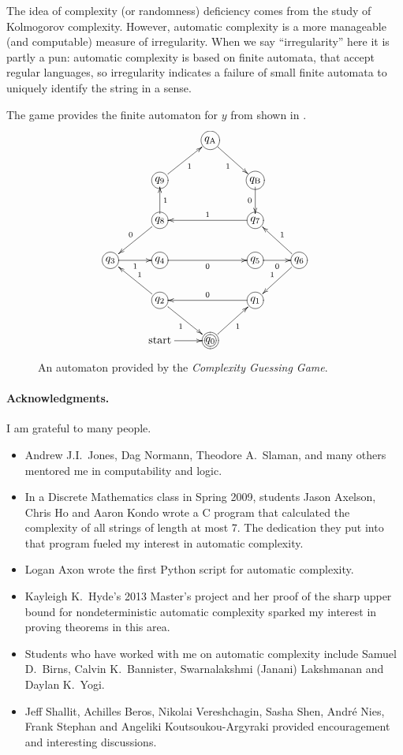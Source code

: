 	The idea of complexity (or randomness) deficiency comes from the study of Kolmogorov complexity.
	However, automatic complexity is a more manageable (and computable) measure of irregularity.
	When we say ``irregularity'' here it is partly a pun:
	automatic complexity is based on finite automata, that accept regular languages,
	so irregularity indicates a failure of small finite automata to uniquely identify the string in a sense.

	The game provides the finite automaton for $y$ from  shown in .
	\begin{figure}
		\centering
		\[
			\xymatrix{
									&								& *+[Fo]{q_{\mathrm A}}\ar[dr]_1   &			   &\\
									& *+[Fo]{q_9}\ar[ur]_1			&				   & *+[Fo]{q_{\mathrm B}}\ar[d]_0  \\
									& *+[Fo]{q_8}\ar[u]_1\ar[dl]_0	&				   & *+[Fo]{q_7}\ar[ll]_1			\\
				*+[Fo]{q_3}\ar[r]_1 & *+[Fo]{q_4}\ar[rr]_0			&				   & *+[Fo]{q_5}\ar[r]_0		   & *+[Fo]{q_6}\ar[ul]_1\ar[dl]_1\\
									& *+[Fo]{q_2}\ar[ul]_1\ar[dr]_1	&				   & *+[Fo]{q_1}\ar[ll]_0		   & \\
									&\text{start}\ar[r]				& *+[Foo]{q_0}\ar[ur]_1
			}
		\]
		\caption{An automaton provided by the \emph{Complexity Guessing Game}.}\label{y-automaton}
	\end{figure}
	\paragraph*{Acknowledgments.}
	I am grateful to many people.
	\begin{itemize}
		\item Andrew J.I.~Jones, Dag Normann, Theodore A.~Slaman, and many others mentored me in computability and logic.
		\item In a Discrete Mathematics class in Spring 2009, students
			Jason Axelson, Chris Ho and Aaron Kondo wrote a C program that calculated the complexity of all strings of length at most 7.
			The dedication they put into that program fueled my interest in automatic complexity.
		\item Logan Axon wrote the first Python script for automatic complexity.
		\item Kayleigh K.~Hyde's 2013 Master's project and
			her proof of the sharp upper bound for nondeterministic automatic complexity sparked my interest in proving theorems in this area.
		\item Students who have worked with me on automatic complexity include Samuel D.~Birns, Calvin K.~Bannister, Swarnalakshmi (Janani) Lakshmanan and Daylan K.~Yogi.
		\item Jeff Shallit, Achilles Beros, Nikolai Vereshchagin, Sasha Shen, Andr\'e Nies, Frank Stephan and Angeliki Koutsoukou-Argyraki
			provided encouragement and interesting discussions.
	\end{itemize}

